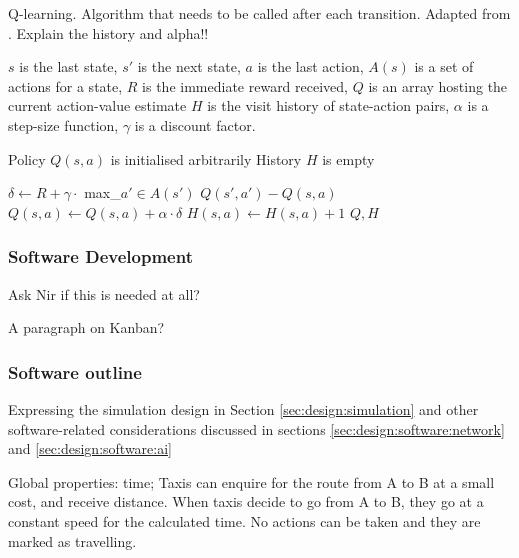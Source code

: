 \begin{algorithm}
  \caption{
  Q-learning. Algorithm that needs to be called after each transition. 
  Adapted from \textcite{Sutton1998ai+reinforcement}. Explain the history and alpha!!
  \label{algorithm:td:sarsa}}

  \begin{algorithmic}[1]
    \Require 
      \Statex $s$ is the last state,
      \Statex $s'$ is the next state,
      \Statex $a$ is the last action,
      \Statex $A(s)$ is a set of actions for a state,
      \Statex $R$ is the immediate reward received,
      \Statex $Q$ is an array hosting the current action-value estimate
      \Statex $H$ is the visit history of state-action pairs,
      \Statex $\alpha$ is a step-size function,
      \Statex $\gamma$ is a discount factor.

      \Statex Policy $Q(s, a)$ is initialised arbitrarily
      \Statex History $H$ is empty

      \State $\delta \gets R + 
              \gamma \cdot$ max_{$a' \in A(s')$} $Q(s', a') - Q(s, a)$
      \State $Q(s, a) \gets Q(s, a) + \alpha \cdot \delta$
      \State $H(s, a) \gets H(s, a) + 1$
      \Return $Q, H$      
    \EndFunction
  \end{algorithmic}

\end{algorithm}


\subsubsection{Software Development}
Ask Nir if this is needed at all?

A paragraph on Kanban? \parencite{Anderson2010kanban}


\subsubsection{Software outline}
\label{sec:design:software}

Expressing the simulation design in Section \ref{sec:design:simulation} and
other software-related considerations discussed in sections
\ref{sec:design:software:network} and \ref{sec:design:software:ai}

Global properties: time; Taxis
can enquire for the route from A to B at a small cost, and receive distance.
When taxis decide to go from A to B, they go at a constant speed for the
calculated time. No actions can be taken and they are marked as travelling.

